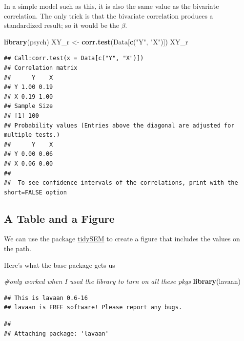 \documentclass[
  11pt,
]{book}
\newenvironment{Shaded}{\begin{snugshade}}{\end{snugshade}}
\newcommand{\CommentTok}[1]{\textcolor[rgb]{0.37,0.37,0.37}{\textit{#1}}}
\newcommand{\FunctionTok}[1]{\textcolor[rgb]{0.27,0.27,0.27}{\textbf{#1}}}
\newcommand{\NormalTok}[1]{#1}
\newcommand{\OtherTok}[1]{\textcolor[rgb]{0.37,0.37,0.37}{#1}}
\newcommand{\StringTok}[1]{\textcolor[rgb]{0.5,0.5,0.5}{#1}}
\begin{document}
In a simple model such as this, it is also the same value as the bivariate correlation. The only trick is that the bivariate correlation produces a standardized result; so it would be the \(\beta\).

\begin{Shaded}
\begin{Highlighting}[]
\FunctionTok{library}\NormalTok{(psych)}
\NormalTok{XY\_r }\OtherTok{\textless{}{-}} \FunctionTok{corr.test}\NormalTok{(Data[}\FunctionTok{c}\NormalTok{(}\StringTok{"Y"}\NormalTok{, }\StringTok{"X"}\NormalTok{)])}
\NormalTok{XY\_r}
\end{Highlighting}
\end{Shaded}

\begin{verbatim}
## Call:corr.test(x = Data[c("Y", "X")])
## Correlation matrix 
##      Y    X
## Y 1.00 0.19
## X 0.19 1.00
## Sample Size 
## [1] 100
## Probability values (Entries above the diagonal are adjusted for multiple tests.) 
##      Y    X
## Y 0.00 0.06
## X 0.06 0.00
## 
##  To see confidence intervals of the correlations, print with the short=FALSE option
\end{verbatim}

\hypertarget{a-table-and-a-figure}{%
\subsection{A Table and a Figure}\label{a-table-and-a-figure}}

We can use the package \href{https://cjvanlissa.github.io/tidySEM/articles/Plotting_graphs.html}{tidySEM} to create a figure that includes the values on the path.

Here's what the base package gets us

\begin{Shaded}
\begin{Highlighting}[]
\CommentTok{\#only worked when I used the library to turn on all these pkgs}
\FunctionTok{library}\NormalTok{(lavaan)}
\end{Highlighting}
\end{Shaded}

\begin{verbatim}
## This is lavaan 0.6-16
## lavaan is FREE software! Please report any bugs.
\end{verbatim}

\begin{verbatim}
## 
## Attaching package: 'lavaan'
\end{verbatim}
\end{document}
